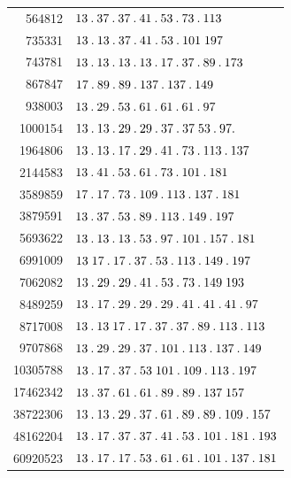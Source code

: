\begin{longtable}{@{}r|l@{}}
564812 & $13\pdot 37\pdot 37\pdot 41\pdot 53\pdot 73\pdot 113$\\
735331 & $13\pdot 13\pdot 37\pdot 41\pdot 53\pdot 101\;197$\\
743781 & $13\pdot 13\pdot 13\pdot 13\pdot 17\pdot 37\pdot 89\pdot 173$\\
867847 & $17\pdot 89\pdot 89\pdot 137\pdot 137\pdot 149$\\
938003 & $13\pdot 29\pdot 53\pdot 61\pdot 61\pdot 61\pdot 97$\\
1000154 & $13\pdot 13\pdot 29\pdot 29\pdot 37\pdot 37\;53\pdot 97\pdot $\\
1964806 & $13\pdot 13\pdot 17\pdot 29\pdot 41\pdot 73\pdot 113\pdot 137$\\
2144583 & $13\pdot 41\pdot 53\pdot 61\pdot 73\pdot 101\pdot 181$\\
3589859 & $17\pdot 17\pdot 73\pdot 109\pdot 113\pdot 137\pdot 181$\\
3879591 & $13\pdot 37\pdot 53\pdot 89\pdot 113\pdot 149\pdot 197$\\
5693622 & $13\pdot 13\pdot 13\pdot 53\pdot 97\pdot 101\pdot 157\pdot 181$\\
6991009 & $13\;17\pdot 17\pdot 37\pdot 53\pdot 113\pdot 149\pdot 197$\\
7062082 & $13\pdot 29\pdot 29\pdot 41\pdot 53\pdot 73\pdot 149\;193$\\
8489259 & $13\pdot 17\pdot 29\pdot 29\pdot 29\pdot 41\pdot 41\pdot 41\pdot 97$\\
8717008 & $13\pdot 13\;17\pdot 17\pdot 37\pdot 37\pdot 89\pdot 113\pdot 113$\\
9707868 & $13\pdot 29\pdot 29\pdot 37\pdot 101\pdot 113\pdot 137\pdot 149$\\
10305788 & $13\pdot 17\pdot 37\pdot 53\;101\pdot 109\pdot 113\pdot 197$\\
17462342 & $13\pdot 37\pdot 61\pdot 61\pdot 89\pdot 89\pdot 137\;157$\\
38722306 & $13\pdot 13\pdot 29\pdot 37\pdot 61\pdot 89\pdot 89\pdot 109\pdot 157$\\
48162204 & $13\pdot 17\pdot 37\pdot 37\pdot 41\pdot 53\pdot 101\pdot 181\pdot 193$\\
60920523 & $13\pdot 17\pdot 17\pdot 53\pdot 61\pdot 61\pdot 101\pdot 137\pdot 181$\\
\end{longtable}\endgroup
